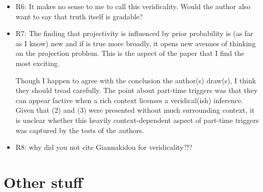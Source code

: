 \documentclass[11pt,fleqn]{article}
\newcommand{\6}{\mbox{$[\hspace*{-.6mm}[$}}
\newcommand{\9}{\mbox{$]\hspace*{-.6mm}]$}}
\begin{document}
{\begin{itemize}
First, the experiment gives very partial contexts, and I thus wonder whether it really tests projection or whether the task may have been a bit metalinguistic, with subjects trying to reconstruct what the expected answers were supposed to be.

are the results unexpected in any way? As for event probability, in a context with little to go by other than a potential link between the given fact and the event described by the complement, the assumption that less probable events are more at issue than more probably events seems reasonable. But we already know from the literature that at-issue-ness affects projectivity.

we already know from the literature that not all that is entailed projects (non factive veridical predicates like ‘be right’), and that not everything that projects is entailed (data in (i)) [complement of announce projects but is not entailed]. Is the goal of the study to show that this holds even with naive speakers? Is there reason to doubt the judgments reported in the existing literature? To better appreciate the contributions of this experiment, it would be useful to see what exactly is novel and unexpected and what motivates the need for an experiment.

\item R6:  It makes no sense to me to call this veridicality.  Would the author also want to say that truth itself is gradable? 

\item R7: The finding that projectivity is influenced by prior probability is (as far as I know) new and if is true more broadly, it opens new avenues of thinking on the projection problem. This is the aspect of the paper that I find the most exciting.

Though I happen to agree with the conclusion the author(s) draw(s), I think they should tread carefully. The point about part-time triggers was that they can appear factive when a rich context licenses a veridical(ish) inference. Given that (2) and (3) were presented without much surrounding context, it is unclear whether this heavily context-dependent aspect of part-time triggers was captured by the tests of the authors.

\item R8: why did you not cite Giannakidou for veridicality?!?

\end{itemize}

\section{Other stuff}


}
\end{document}
